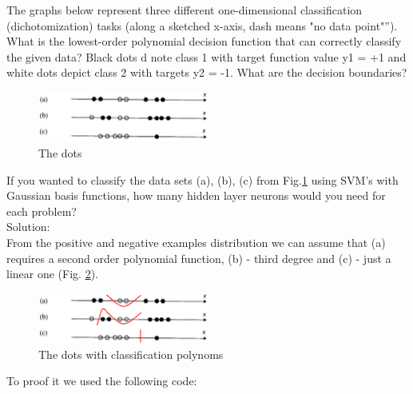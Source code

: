 \documentclass[a4paper, 12pt]{article}
\begin{document}
The graphs below represent three different one-dimensional classification
(dichotomization) tasks (along a sketched x-axis, dash means "no data point"”). What is the lowest-order polynomial decision function that can correctly classify the given data? Black dots d note class 1 with target function value y1 = +1 and white dots depict class 2 with targets y2 = -1. What are the decision boundaries?\\

\begin{figure}[h!]
  \centering
  \caption{The dots \label{fig:dots}}
  \includegraphics[width=0.5\textwidth]{dots}
\end{figure}

If you wanted to classify the data sets (a), (b), (c) from Fig.\ref{fig:dots} using SVM’s with Gaussian basis functions, how many hidden layer neurons would you need for each problem?\\

Solution:\\

From the positive and negative examples distribution we can assume that (a) requires a second order polynomial function, (b) - third degree and (c) - just a linear one (Fig. \ref{fig:dotsPol}).\\

\begin{figure}[h!]
  \centering
  \caption{The dots with classification polynoms \label{fig:dotsPol}}
  \includegraphics[width=0.5\textwidth]{dotsPol}
\end{figure}

To proof it we used the following code:\\
\end{document}
